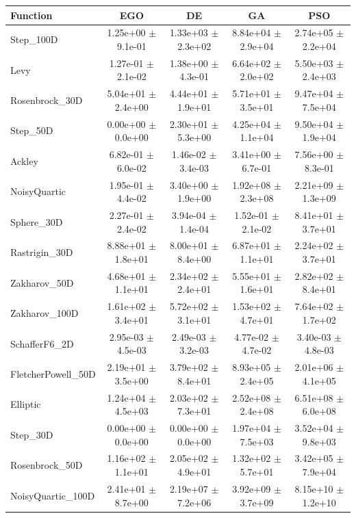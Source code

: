 \begin{table}[h]
\centering
\begin{tabular}{lcccc}
\hline
Function & EGO & DE & GA & PSO \\
\hline
Step_100D & 1.25e+00 $\pm$ 9.1e-01 & 1.33e+03 $\pm$ 2.3e+02 & 8.84e+04 $\pm$ 2.9e+04 & 2.74e+05 $\pm$ 2.2e+04 \\
Levy & 1.27e-01 $\pm$ 2.1e-02 & 1.38e+00 $\pm$ 4.3e-01 & 6.64e+02 $\pm$ 2.0e+02 & 5.50e+03 $\pm$ 2.4e+03 \\
Rosenbrock_30D & 5.04e+01 $\pm$ 2.4e+00 & 4.44e+01 $\pm$ 1.9e+01 & 5.71e+01 $\pm$ 3.5e+01 & 9.47e+04 $\pm$ 7.5e+04 \\
Step_50D & 0.00e+00 $\pm$ 0.0e+00 & 2.30e+01 $\pm$ 5.3e+00 & 4.25e+04 $\pm$ 1.1e+04 & 9.50e+04 $\pm$ 1.9e+04 \\
Ackley & 6.82e-01 $\pm$ 6.0e-02 & 1.46e-02 $\pm$ 3.4e-03 & 3.41e+00 $\pm$ 6.7e-01 & 7.56e+00 $\pm$ 8.3e-01 \\
NoisyQuartic & 1.95e-01 $\pm$ 4.4e-02 & 3.40e+00 $\pm$ 1.9e+00 & 1.92e+08 $\pm$ 2.3e+08 & 2.21e+09 $\pm$ 1.3e+09 \\
Sphere_30D & 2.27e-01 $\pm$ 2.4e-02 & 3.94e-04 $\pm$ 1.4e-04 & 1.52e-01 $\pm$ 2.1e-02 & 8.41e+01 $\pm$ 3.7e+01 \\
Rastrigin_30D & 8.88e+01 $\pm$ 1.8e+01 & 8.00e+01 $\pm$ 8.4e+00 & 6.87e+01 $\pm$ 1.1e+01 & 2.24e+02 $\pm$ 3.7e+01 \\
Zakharov_50D & 4.68e+01 $\pm$ 1.1e+01 & 2.34e+02 $\pm$ 2.4e+01 & 5.55e+01 $\pm$ 1.6e+01 & 2.82e+02 $\pm$ 8.4e+01 \\
Zakharov_100D & 1.61e+02 $\pm$ 3.4e+01 & 5.72e+02 $\pm$ 3.1e+01 & 1.53e+02 $\pm$ 4.7e+01 & 7.64e+02 $\pm$ 1.7e+02 \\
SchafferF6_2D & 2.95e-03 $\pm$ 4.5e-03 & 2.49e-03 $\pm$ 3.2e-03 & 4.77e-02 $\pm$ 4.7e-02 & 3.40e-03 $\pm$ 4.8e-03 \\
FletcherPowell_50D & 2.19e+01 $\pm$ 3.5e+00 & 3.79e+02 $\pm$ 8.4e+01 & 8.93e+05 $\pm$ 2.4e+05 & 2.01e+06 $\pm$ 4.1e+05 \\
Elliptic & 1.24e+04 $\pm$ 4.5e+03 & 2.03e+02 $\pm$ 7.3e+01 & 2.52e+08 $\pm$ 2.4e+08 & 6.51e+08 $\pm$ 6.0e+08 \\
Step_30D & 0.00e+00 $\pm$ 0.0e+00 & 0.00e+00 $\pm$ 0.0e+00 & 1.97e+04 $\pm$ 7.5e+03 & 3.52e+04 $\pm$ 9.8e+03 \\
Rosenbrock_50D & 1.16e+02 $\pm$ 1.1e+01 & 2.05e+02 $\pm$ 4.9e+01 & 1.32e+02 $\pm$ 5.7e+01 & 3.42e+05 $\pm$ 7.9e+04 \\
NoisyQuartic_100D & 2.41e+01 $\pm$ 8.7e+00 & 2.19e+07 $\pm$ 7.2e+06 & 3.92e+09 $\pm$ 3.7e+09 & 8.15e+10 $\pm$ 1.2e+10 \\

\end{tabular}
\end{table}
